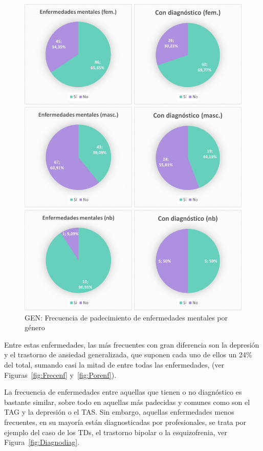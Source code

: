 \documentclass[12pt, a4paper,twoside,titlepage]{book}
\begin{document}
\begin{figure}
\centering
 \includegraphics[width=1\linewidth]{Imagenes Form GEN/13GENEnfgeneros}
 \caption{GEN: Frecuencia de padecimiento de enfermedades mentales por género}
 \label{fig:Enfdiaggeneros}
 \end{figure}

Entre estas enfermedades, las más frecuentes con gran diferencia son la depresión y el trastorno de ansiedad generalizada, que suponen cada uno de ellos un 24\% del total, sumando casi la mitad de entre todas las enfermedades, (ver Figuras~\ref{fig:Frecenf} y~\ref{fig:Porenf}). 

La frecuencia de enfermedades entre aquellas que tienen o no diagnóstico es bastante similar, sobre todo en aquellas más padecidas y comunes como son el TAG y la depresión o el TAS. Sin embargo, aquellas enfermedades menos frecuentes, en su mayoría están diagnosticadas por profesionales, se trata por ejemplo del caso de los TDs, el trastorno bipolar o la esquizofrenia, ver Figura~\ref{fig:Diagnodiag}. 
\end{document}
